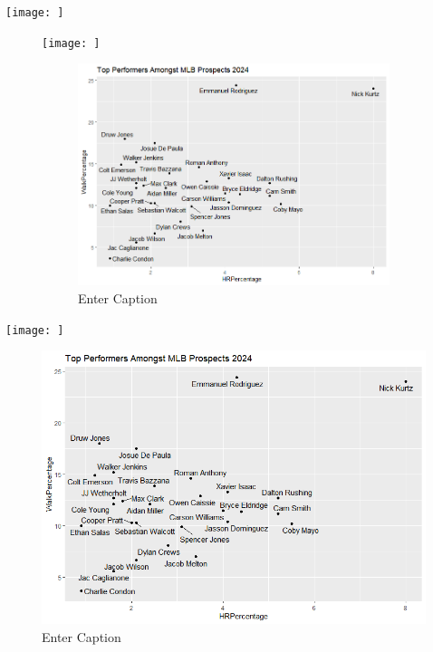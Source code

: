 \documentclass{article}
\begin{document}
\newpage



\texttt{[image: ]}
\begin{figure}
    \centering
    \texttt{[image: ]}
\begin{figure}
        \centering
        \includegraphics[width=0.5\linewidth]{PS6c_Matthies.png}
        \caption{Enter Caption}
        \label{fig:enter-label}
    \end{figure}
        \caption{}
    \label{fig:enter-label}
\end{figure}

\vspace{1.5cm}


\texttt{[image: ]}
\begin{figure}
    \centering
    \includegraphics[width=0.5\linewidth]{PS6c_Matthies.png}
    \caption{Enter Caption}
    \label{fig:enter-label}
\end{figure}
\end{document}
